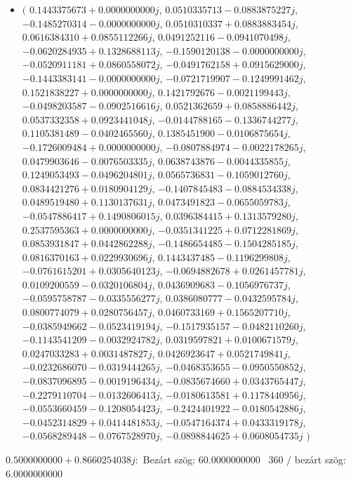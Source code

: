 \documentclass[14pt,a4paper]{article}
\begin{document}
\begin{itemize}
\item
$\big($
$0.1443375673+0.0000000000j$, $0.0510335713-0.0883875227j$, $-0.1485270314-0.0000000000j$, $0.0510310337+0.0883883454j$, $0.0616384310+0.0855112266j$, $0.0491252116-0.0941070498j$, $-0.0620284935+0.1328688113j$, $-0.1590120138-0.0000000000j$, $-0.0520911181+0.0860558072j$, $-0.0491762158+0.0915629000j$, $-0.1443383141-0.0000000000j$, $-0.0721719907-0.1249991462j$, $0.1521838227+0.0000000000j$, $0.1421792676-0.0021199443j$, $-0.0498203587-0.0902516616j$, $0.0521362659+0.0858886442j$, $0.0537332358+0.0923441048j$, $-0.0144788165-0.1336744277j$, $0.1105381489-0.0402465560j$, $0.1385451900-0.0106875654j$, $-0.1726009484+0.0000000000j$, $-0.0807884974-0.0022178265j$, $0.0479903646-0.0076503335j$, $0.0638743876-0.0044335855j$, $0.1249053493-0.0496204801j$, $0.0565736831-0.1059012760j$, $0.0834421276+0.0180904129j$, $-0.1407845483-0.0884534338j$, $0.0489519480+0.1130137631j$, $0.0473491823-0.0655059783j$, $-0.0547886417+0.1490806015j$, $0.0396384415+0.1313579280j$, $0.2537595363+0.0000000000j$, $-0.0351341225+0.0712281869j$, $0.0853931847+0.0442862288j$, $-0.1486654485-0.1504285185j$, $0.0816370163+0.0229930696j$, $0.1443437485-0.1196299808j$, $-0.0761615201+0.0305640123j$, $-0.0694882678+0.0261457781j$, $0.0109200559-0.0320106804j$, $0.0436909683-0.1056976737j$, $-0.0595758787-0.0335556277j$, $0.0386080777-0.0432595784j$, $0.0800774079+0.0280756457j$, $0.0460733169+0.1565207710j$, $-0.0385949662-0.0523419194j$, $-0.1517935157-0.0482110260j$, $-0.1143541209-0.0032924782j$, $0.0319597821+0.0100671579j$, $0.0247033283+0.0031487827j$, $0.0426923647+0.0521749841j$, $-0.0232686070-0.0319444265j$, $-0.0468353655-0.0950550852j$, $-0.0837096895-0.0019196434j$, $-0.0835674660+0.0343765447j$, $-0.2279110704-0.0132606413j$, $-0.0180613581+0.1178440956j$, $-0.0553660459-0.1208054423j$, $-0.2424401922-0.0180542886j$, $-0.0452314829+0.0414481853j$, $-0.0547164374+0.0433319178j$, $-0.0568289448-0.0767528970j$, $-0.0898844625+0.0608054735j$
$\big)$
\end{itemize}
$0.5000000000+0.8660254038j$:\
Bezárt szög: $60.0000000000$ \
360 / bezárt szög: $6.0000000000$\
\end{document}
